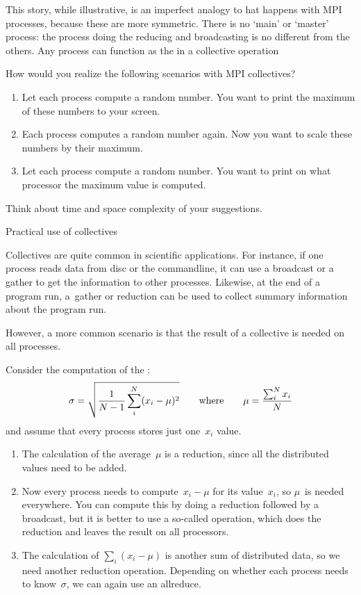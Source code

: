 This story, while illustrative, is an imperfect analogy to hat happens with MPI
processes, because these are more symmetric.
There is no `main' or `master' process: the process doing the
reducing and broadcasting is no different from the others.
Any process can function as the  in a
collective operation

\begin{exercise}
  \label{ex:collective-cases}
  How would you realize the following scenarios with MPI collectives?
  \begin{enumerate}
  \item Let each process compute a random number. You want to print the
    maximum of these numbers to your screen.
  \item Each process computes a random number again. Now you want to
    scale these numbers by their maximum. 
  \item Let each process compute a random number. You want to print on what processor the
    maximum value is computed. 
  \end{enumerate}
  Think about time and space complexity of your suggestions.
\end{exercise}

 {Practical use of collectives}

Collectives are quite common in scientific applications. For instance,
if one process reads data from disc or the commandline, it can use a
broadcast or a gather to get the information to other
processes. Likewise, at the end of a program run, a~gather or
reduction can be used to collect summary information about the program
run.

However, a more common scenario is 
that the result of a collective is needed on all processes.

Consider the computation of the :
\[ \sigma = \sqrt{\frac1{N-1} \sum_i^N (x_i-\mu)^2 }
\qquad\hbox{where}\qquad \mu = \frac{\sum_i^Nx_i}N
\]
and assume that every process stores just one~$x_i$ value.
\begin{enumerate}
\item The calculation of the average~$\mu$ is a reduction, since all
  the distributed values need to be added.
\item Now every
  process needs to compute~$x_i-\mu$ for its value~$x_i$, so $\mu$~is
  needed everywhere. You can compute this by doing a reduction followed
  by a broadcast, but it is better to use a so-called
   operation, which does the reduction and leaves
  the result on all processors.
\item The calculation of $\sum_i(x_i-\mu)$ is another sum of
  distributed data, so we need another reduction operation. Depending
  on whether each process needs to know~$\sigma$, we can again use an
  allreduce.
\end{enumerate}

